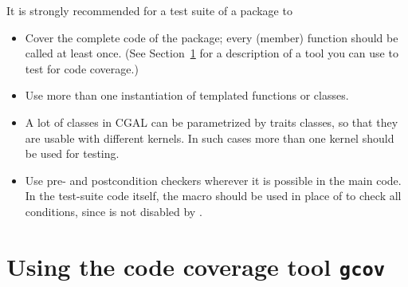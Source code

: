 It is strongly recommended for a test suite of a package to
\begin {itemize}
\item Cover the complete code of the package; every (member) function
      should be called at least once. (See Section~\ref{sec:gcov} for
      a description of a tool you can use to test for code coverage.)
\item Use more than one instantiation of templated functions or classes.
\item A lot of classes in CGAL can be parametrized by traits classes, so 
      that they are usable with different kernels. In such cases more than one
      kernel should be used for testing.
\item Use pre- and postcondition checkers wherever it is possible in the
      main code.  In the test-suite code itself, the macro 
      should be used in place of  to check 
      all conditions, since  is not disabled by . 
\end {itemize}

\section{Using the code coverage tool \texttt{gcov}}
\label{sec:gcov}

